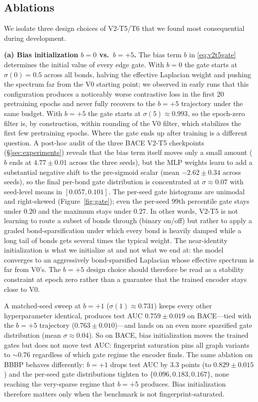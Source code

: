 \documentclass[conference]{IEEEtran}
\begin{document}
\subsection{Ablations}
\label{sec:ablations}
We isolate three design choices of V2-T5/T6 that we found most consequential during development.

\noindent\textbf{(a) Bias initialization $b{=}0$ vs.\ $b{=}{+}5$.}
The bias term $b$ in \eqref{eq:v2t5gate} determines the initial value of every edge gate. With $b{=}0$ the gate starts at $\sigma(0){=}0.5$ across all bonds, halving the effective Laplacian weight and pushing the spectrum far from the V0 starting point; we observed in early runs that this configuration produces a noticeably worse contrastive loss in the first $20$ pretraining epochs and never fully recovers to the $b{=}{+}5$ trajectory under the same budget. With $b{=}{+}5$ the gate starts at $\sigma(5)\approx 0.993$, so the epoch-zero filter is, by construction, within rounding of the V0 filter, which stabilizes the first few pretraining epochs. Where the gate ends up after training is a different question. A post-hoc audit of the three BACE V2-T5 checkpoints (\S\ref{sec:experiments}) reveals that the bias term itself moves only a small amount ($b$ ends at $4.77\pm 0.01$ across the three seeds), but the MLP weights learn to add a substantial negative shift to the pre-sigmoid scalar (mean $-2.62 \pm 0.34$ across seeds), so the final per-bond gate distribution is concentrated at $\sigma\approx 0.07$ with seed-level means in $[0.057, 0.101]$. The per-seed gate histograms are unimodal and right-skewed (Figure~\ref{fig:gate}); even the per-seed 99th percentile gate stays under $0.20$ and the maximum stays under $0.27$. In other words, V2-T5 is not learning to route a subset of bonds through (binary on/off) but rather to apply a graded bond-sparsification under which every bond is heavily damped while a long tail of bonds gets several times the typical weight. The near-identity initialization is what we initialize at and not what we end at: the model converges to an aggressively bond-sparsified Laplacian whose effective spectrum is far from V0's. The $b{=}{+}5$ design choice should therefore be read as a stability constraint at epoch zero rather than a guarantee that the trained encoder stays close to V0.

A matched-seed sweep at $b{=}{+}1$ ($\sigma(1)\approx 0.731$) keeps every other hyperparameter identical, produces test AUC $0.759 \pm 0.019$ on BACE---tied with the $b{=}{+}5$ trajectory ($0.763 \pm 0.010$)---and lands on an even more sparsified gate distribution (mean $\sigma\approx 0.04$). So on BACE, bias initialization moves the trained gates but does not move test AUC: fingerprint saturation pins all graph variants to $\sim$$0.76$ regardless of which gate regime the encoder finds. The same ablation on BBBP behaves differently: $b{=}{+}1$ drops test AUC by $3.3$ points (to $0.829 \pm 0.015$) and the per-seed gate distributions tighten to $\{0.096, 0.183, 0.167\}$, none reaching the very-sparse regime that $b{=}{+}5$ produces. Bias initialization therefore matters only when the benchmark is not fingerprint-saturated.
\end{document}
